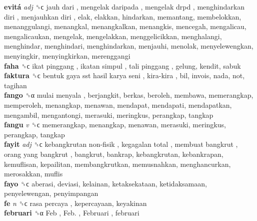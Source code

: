 \textbf{evitá} \emph{adj}  ␝ϲ   jauh dari ,  mengelak daripada ,  mengelak drpd ,  menghindarkan diri ,  menjauhkan diri , elak, elakkan, hindarkan, memantang, membelokkan, menanggulangi, menangkal, menangkalkan, menangkis, mencegah, mengalicau, mengalicaukan, mengelak, mengelakkan, menggelicikkan, menghalangi, menghindar, menghindari, menghindarkan, menjauhi, menolak, menyelewengkan, menyingkir, menyingkirkan, merenggangi  \\
\textbf{faha} ␝ϲ   ikat pinggang ,  ikatan simpul ,  tali pinggang , gelung, kendit, sabuk  \\
\textbf{faktura} ␝ϲ   bentuk gaya sst hasil karya seni ,  kira-kira , bil, invois, nada, not, tagihan  \\
\textbf{fango} ␝α   mulai menyala , berjangkit, berkas, beroleh, membawa, memerangkap, memperoleh, menangkap, menawan, mendapat, mendapati, mendapatkan, mengambil, mengantongi, merasuki, meringkus, perangkap, tangkap  \\
\textbf{fangu} \emph{v}  ␝ϲ  memerangkap, menangkap, menawan, merasuki, meringkus, perangkap, tangkap  \\
\textbf{fayit} \emph{adj}  ␝ϲ   kebangkrutan non-fisik ,  kegagalan total ,  membuat bangkrut ,  orang yang bangkrut , bangkrut, bankrap, kebangkrutan, kebankrapan, kemuflisan, kepailitan, membangkrutkan, memusnahkan, menghancurkan, merosakkan, muflis  \\
\textbf{fayo} ␝ϲ  aberasi, deviasi, kelainan, ketaksekataan, ketidaksamaan, penyelewengan, penyimpangan  \\
\textbf{fe} \emph{n}  ␝ϲ   rasa percaya , kepercayaan, keyakinan  \\
\textbf{februari} ␝α   Feb ,  Feb. ,  Februari , februari  \\
